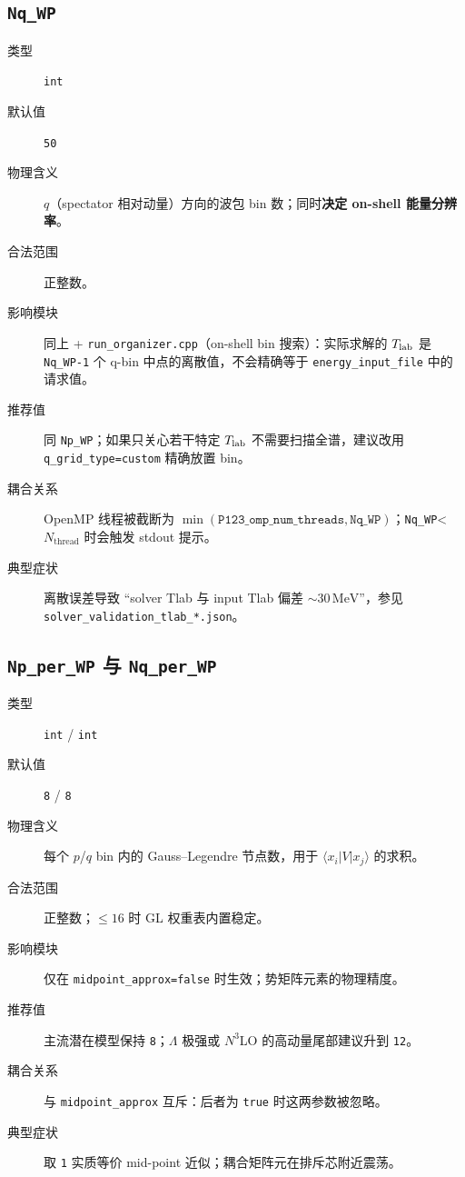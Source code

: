 \subsection{\texttt{Nq\_WP}}

\begin{description}
  \item[类型] \texttt{int}
  \item[默认值] \texttt{50}
  \item[物理含义] \(q\)（spectator 相对动量）方向的波包 bin 数；同时\textbf{决定 on-shell 能量分辨率}。
  \item[合法范围] 正整数。
  \item[影响模块] 同上 + \texttt{run\_organizer.cpp}（on-shell bin 搜索）：实际求解的 \({T_{\text{lab}}}\) 是 \texttt{Nq\_WP-1} 个 q-bin 中点的离散值，不会精确等于
        \texttt{energy\_input\_file} 中的请求值。
  \item[推荐值] 同 \texttt{Np\_WP}；如果只关心若干特定 \({T_{\text{lab}}}\) 不需要扫描全谱，建议改用 \texttt{q\_grid\_type=custom} 精确放置 bin。
  \item[耦合关系] OpenMP 线程被截断为 \(\min(\texttt{P123\_omp\_num\_threads},\texttt{Nq\_WP})\)；\texttt{Nq\_WP}<\(N_\text{thread}\) 时会触发 stdout 提示。
  \item[典型症状] 离散误差导致 “solver Tlab 与 input Tlab 偏差 \(\sim 30\,\mathrm{MeV}\)”，参见 \texttt{solver\_validation\_tlab\_*.json}。
\end{description}

\subsection{\texttt{Np\_per\_WP} 与 \texttt{Nq\_per\_WP}}

\begin{description}
  \item[类型] \texttt{int} / \texttt{int}
  \item[默认值] \texttt{8} / \texttt{8}
  \item[物理含义] 每个 \(p\)/\(q\) bin 内的 Gauss–Legendre 节点数，用于 \(\langle x_i|V|x_j\rangle\) 的求积。
  \item[合法范围] 正整数；\(\le 16\) 时 GL 权重表内置稳定。
  \item[影响模块] 仅在 \texttt{midpoint\_approx=false} 时生效；势矩阵元素的物理精度。
  \item[推荐值] 主流潜在模型保持 \texttt{8}；\(\Lambda\) 极强或 \(N^3\)LO 的高动量尾部建议升到 \texttt{12}。
  \item[耦合关系] 与 \texttt{midpoint\_approx} 互斥：后者为 \texttt{true} 时这两参数被忽略。
  \item[典型症状] 取 \texttt{1} 实质等价 mid-point 近似；耦合矩阵元在排斥芯附近震荡。
\end{description}

